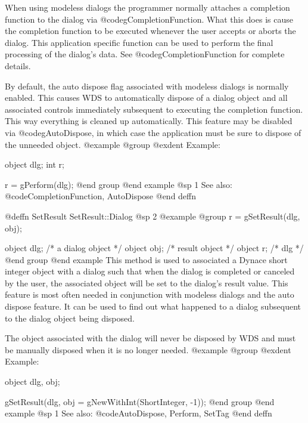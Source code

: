 When using modeless dialogs the programmer normally attaches a completion
function to the dialog via @code{gCompletionFunction}.  What this does
is cause the completion function to be executed whenever the user
accepts or aborts the dialog.  This application specific function can be
used to perform the final processing of the dialog's data.  See
@code{gCompletionFunction} for complete details.

By default, the auto dispose flag associated with modeless dialogs is
normally enabled.  This causes WDS to automatically dispose of a dialog
object and all associated controls immediately subsequent to executing
the completion function.  This way everything is cleaned up automatically.
This feature may be disabled via @code{gAutoDispose}, in which case the
application must be sure to dispose of the unneeded object.
@example
@group
@exdent Example:

object  dlg;
int     r;

r = gPerform(dlg);
@end group
@end example
@sp 1
See also:  @code{CompletionFunction, AutoDispose}
@end deffn













@deffn {SetResult} SetResult::Dialog
@sp 2
@example
@group
r = gSetResult(dlg, obj);

object  dlg;    /*  a dialog object  */
object  obj;    /*  result object    */
object  r;      /*  dlg              */
@end group
@end example
This method is used to associated a Dynace short integer object with a
dialog such that when the dialog is completed or canceled by the user,
the associated object will be set to the dialog's result value.  This
feature is most often needed in conjunction with modeless dialogs and
the auto dispose feature.  It can be used to find out what happened to a
dialog subsequent to the dialog object being disposed.

The object associated with the dialog will never be disposed by WDS
and must be manually disposed when it is no longer needed.
@example
@group
@exdent Example:

object  dlg, obj;

gSetResult(dlg, obj = gNewWithInt(ShortInteger, -1));
@end group
@end example
@sp 1
See also:  @code{AutoDispose, Perform, SetTag}
@end deffn










